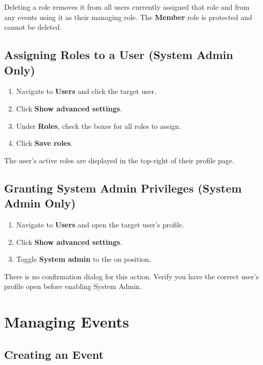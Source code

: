 \documentclass[12pt, twoside]{report}
\newcommand{\uielem}[1]{\textbf{#1}}
\begin{document}
\begin{warnbox}
Deleting a role removes it from all users currently assigned that role and
from any events using it as their managing role. The \textbf{Member} role
is protected and cannot be deleted.
\end{warnbox}

\section{Assigning Roles to a User (System Admin Only)}

\begin{enumerate}
  \item Navigate to \uielem{Users} and click the target user.
  \item Click \uielem{Show advanced settings}.
  \item Under \uielem{Roles}, check the boxes for all roles to assign.
  \item Click \uielem{Save roles}.
\end{enumerate}

The user's active roles are displayed in the top-right of their profile page.

\section{Granting System Admin Privileges (System Admin Only)}

\begin{enumerate}
  \item Navigate to \uielem{Users} and open the target user's profile.
  \item Click \uielem{Show advanced settings}.
  \item Toggle \uielem{System admin} to the on position.
\end{enumerate}

\begin{warnbox}
There is no confirmation dialog for this action. Verify you have the correct
user's profile open before enabling System Admin.
\end{warnbox}


\chapter{Managing Events}

\section{Creating an Event}
\end{document}
